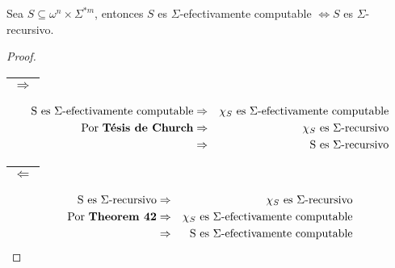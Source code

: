   \begin{theorem}
     \PN Sea $S \subseteq \omega^{n} \times \Sigma^{\ast m}$, entonces $S$ es $\Sigma$-efectivamente computable
     $\Leftrightarrow S$ es $\Sigma$-recursivo.
  \end{theorem}
  \begin{proof}
    \begin{tabular}{|c|} \hline $\Rightarrow$ \\\hline \end{tabular}
    \begin{eqnarray*}
      \text{S es $\Sigma$-efectivamente computable} &\Rightarrow& \chi_{S}\text{ es $\Sigma$-efectivamente computable} \\
      \text{Por \textbf{Tésis de Church}} &\Rightarrow& \chi_{S} \text{ es $\Sigma$-recursivo} \\
      &\Rightarrow& \text{S es $\Sigma$-recursivo}
    \end{eqnarray*}

    \PN \begin{tabular}{|c|} \hline $\Leftarrow$ \\\hline \end{tabular}
    \begin{eqnarray*}
      \text{S es $\Sigma$-recursivo} &\Rightarrow& \chi_{S}\text{ es $\Sigma$-recursivo} \\
      \text{Por \textbf{Theorem 42}} &\Rightarrow& \chi_{S} \text{ es $\Sigma$-efectivamente computable} \\
      &\Rightarrow& \text{S es $\Sigma$-efectivamente computable}
    \end{eqnarray*}
  \end{proof}

